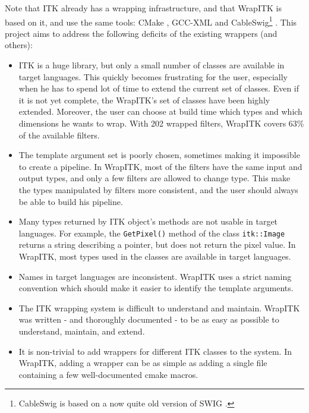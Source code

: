 \documentclass{InsightArticle}
\begin{document}
Note that ITK already has a wrapping infrastructure, and that WrapITK is based
on it, and use the same tools: CMake \cite{CMakeWebSite}, GCC-XML \cite{GccxmlWebsite}
and CableSwig\footnote{CableSwig is based on a now quite old version of SWIG
\cite{SwigWebSite}.} \cite{CableSwigWebSite}. This project aims to
address the following deficits of the existing wrappers (and others):
\begin{itemize}
  \item  ITK is a huge library, but only a small number of classes are available
in target languages. This quickly becomes frustrating for the user, especially when
he has to spend lot of time to extend the current set of classes. Even if it is
not yet complete, the WrapITK's set of classes have been highly extended. Moreover,
the user can choose at build time which types and which dimensions he wants to wrap.
With 202 wrapped filters, WrapITK covers 63\% of the available filters.

  \item  The template argument set is poorly chosen, sometimes making it impossible
to create a pipeline. In WrapITK, most of the filters have the same input and output
types, and only a few filters are allowed to change type. This make the types manipulated
by filters more consistent, and the user should always be able to build his pipeline.

  \item  Many types returned by ITK object's methods are not usable in target
languages. For example, the \verb$GetPixel()$ method of the class \verb$itk::Image$
returns a string describing a pointer, but does not return the pixel value. In WrapITK,
most types used in the classes are available in target languages.

  \item  Names in target languages are inconsistent. WrapITK uses a strict naming
convention which should make it easier to identify the template arguments.

  \item  The ITK wrapping system is difficult to understand and maintain. WrapITK was
written - and thoroughly documented - to be as easy as possible to understand,
maintain, and extend.

  \item  It is non-trivial to add wrappers for different ITK classes to the system. In
WrapITK, adding a wrapper can be as simple as adding a single file containing a
few well-documented cmake macros.


\end{itemize}
\end{document}
